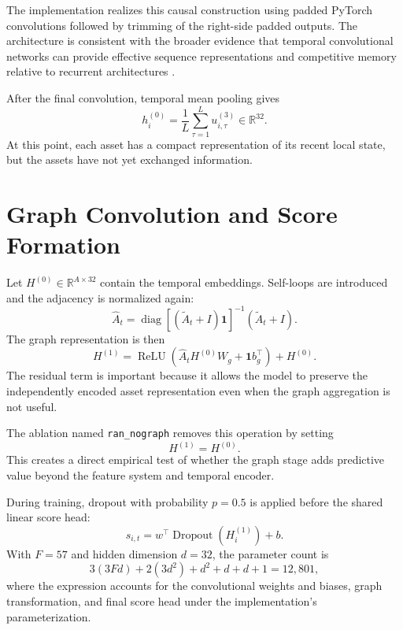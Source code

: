 \documentclass[10pt]{article}
\begin{document}
The implementation realizes this causal construction using padded PyTorch convolutions followed by trimming of the right-side padded outputs. The architecture is consistent with the broader evidence that temporal convolutional networks can provide effective sequence representations and competitive memory relative to recurrent architectures \citep{bai2018}.

After the final convolution, temporal mean pooling gives
\begin{equation}
h_i^{(0)}
=
\frac{1}{L}
\sum_{\tau=1}^{L}
u^{(3)}_{i,\tau}
\in\mathbb{R}^{32}.
\end{equation}
At this point, each asset has a compact representation of its recent local state, but the assets have not yet exchanged information.

\section{Graph Convolution and Score Formation}

Let $H^{(0)}\in\mathbb{R}^{A\times32}$ contain the temporal embeddings. Self-loops are introduced and the adjacency is normalized again:
\begin{equation}
\hat A_t
=
\operatorname{diag}
\left[
(\tilde A_t+I)\mathbf 1
\right]^{-1}
(\tilde A_t+I).
\end{equation}
The graph representation is then
\begin{equation}
H^{(1)}
=
\operatorname{ReLU}
\left(
\hat A_tH^{(0)}W_g+\mathbf 1b_g^\top
\right)
+
H^{(0)}.
\end{equation}
The residual term is important because it allows the model to preserve the independently encoded asset representation even when the graph aggregation is not useful.

The ablation named \texttt{ran\_nograph} removes this operation by setting
\begin{equation}
H^{(1)}=H^{(0)}.
\end{equation}
This creates a direct empirical test of whether the graph stage adds predictive value beyond the feature system and temporal encoder.

During training, dropout with probability $p=0.5$ is applied before the shared linear score head:
\begin{equation}
s_{i,t}
=
w^\top
\operatorname{Dropout}(H^{(1)}_i)+b.
\end{equation}
With $F=57$ and hidden dimension $d=32$, the parameter count is
\begin{equation}
3(3Fd)+2(3d^2)+d^2+d+d+1=12,801,
\end{equation}
where the expression accounts for the convolutional weights and biases, graph transformation, and final score head under the implementation's parameterization.
\end{document}
